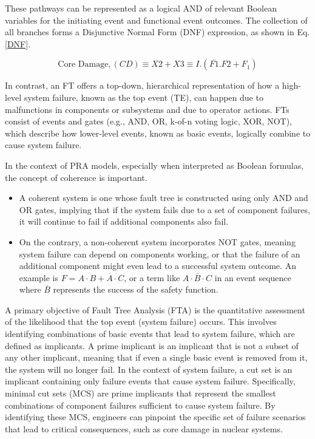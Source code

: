 These pathways can be represented as a logical AND of relevant Boolean variables for the initiating event and functional event outcomes. The collection of all branches forms a Disjunctive Normal Form (DNF) expression, as shown in Eq. \ref{DNF}.

\begin{equation}
\label{DNF}
\text{Core Damage}, (CD) \equiv X2 + X3 \equiv I.(\overline{F1}.F2 + F_1)
\end{equation}

In contrast, an FT offers a top-down, hierarchical representation of how a high-level system failure, known as the top event (TE), can happen due to malfunctions in components or subsystems and due to operator actions. FTs consist of events and gates (e.g., AND, OR, k-of-n voting logic, XOR, NOT), which describe how lower-level events, known as basic events, logically combine to cause system failure.

In the context of PRA models, especially when interpreted as Boolean formulas, the concept of coherence is important.

\begin{itemize}
\item A coherent system is one whose fault tree is constructed using only AND and OR gates, implying that if the system fails due to a set of component failures, it will continue to fail if additional components also fail.
\item On the contrary, a non-coherent system incorporates NOT gates, meaning system failure can depend on components working, or that the failure of an additional component might even lead to a successful system outcome. An example is $F = A \cdot B + \overline A \cdot C$, or a term like $A \cdot \overline B \cdot C$ in an event sequence where $\overline B$ represents the success of the safety function.
\end{itemize}

A primary objective of Fault Tree Analysis (FTA) is the quantitative assessment of the likelihood that the top event (system failure) occurs. This involves identifying combinations of basic events that lead to system failure, which are defined as implicants. A prime implicant is an implicant that is not a subset of any other implicant, meaning that if even a single basic event is removed from it, the system will no longer fail. In the context of system failure, a cut set is an implicant containing only failure events that cause system failure. Specifically, minimal cut sets (MCS) are prime implicants that represent the smallest combinations of component failures sufficient to cause system failure. By identifying these MCS, engineers can pinpoint the specific set of failure scenarios that lead to critical consequences, such as core damage in nuclear systems.

